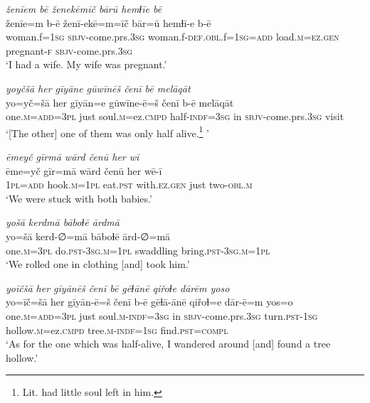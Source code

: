 \ea \label{ZQ.13}
\textit{ženīem bē ženekēmīč bārū hemɫīe bē} \\ 
\gll ženīe=m b-ē ženī-ekē=m=īč bār=ū hemɫī-e b-ē \\ 
 woman.f\textsc{=\textsc{1sg}} \textsc{sbjv-}come.prs\textsc{.3sg} woman.f\textsc{-def}\textsc{.obl}.f\textsc{=\textsc{1sg}}\textsc{=add} load\textsc{.m}\textsc{=ez.gen} pregnant\textsc{-f} \textsc{sbjv-}come.prs\textsc{.3sg} \\ 
\glt `I had a wife. My wife was pregnant.'
\z 
 
\ea \label{ZQ.19}
\textit{yoyčšā her gīyāne gūwīnēš čenī bē melāqāt} \\ 
\gll yo=yč=šā her gīyān=e gūwīne-ē=š čenī b-ē melāqāt \\ 
 one\textsc{.m}\textsc{=add}\textsc{=3pl} just soul\textsc{.m}=ez\textsc{.cmpd} half\textsc{-indf}\textsc{=3sg} in \textsc{sbjv-}come.prs\textsc{.3sg} visit \\ 
\glt `[The other] one of them was only half alive.\footnote{Lit. had little soul left in him.}    '
\z 
 
\ea \label{ZQ.21}
\textit{ēmeyč gīrmā wārd čenū her wī} \\ 
\gll ēme=yč gīr=mā wārd čenū her wē-ī \\ 
 \textsc{1pl}\textsc{=add} hook\textsc{.m}\textsc{=\textsc{1pl}} eat\textsc{.pst} with\textsc{.ez.gen} just two\textsc{-obl}\textsc{.m} \\ 
\glt `We were stuck with both babies.'
\z 
 
\ea \label{ZQ.22}
\textit{yošā kerdmā bāboɫē ārdmā} \\ 
\gll yo=šā kerd-∅=mā bāboɫē ārd-∅=mā \\ 
 one\textsc{.m}\textsc{=3pl} do\textsc{.pst}\textsc{-3sg}\textsc{.m}\textsc{=\textsc{1pl}} swaddling bring\textsc{.pst}\textsc{-3sg}\textsc{.m}\textsc{=\textsc{1pl}} \\ 
\glt `We rolled one in clothing [and] took him.'
\z 
 
\ea \label{ZQ.23}
\textit{yoīčšā her gīyānēš čenī bē gēɫānē qiřoɫe dārēm yoso} \\ 
\gll yo=īč=šā her gīyān-ē=š čenī b-ē gēɫā-ānē qiřoɫ=e dār-ē=m yos=o \\ 
 one\textsc{.m}\textsc{=add}\textsc{=3pl} just soul\textsc{.m}\textsc{-indf}\textsc{=3sg} in \textsc{sbjv-}come.prs\textsc{.3sg} turn\textsc{.pst}\textsc{-\textsc{1sg}} hollow\textsc{.m}=ez\textsc{.cmpd} tree\textsc{.m}\textsc{-indf}\textsc{=\textsc{1sg}} find\textsc{.pst}\textsc{=compl} \\ 
\glt `As for the one which was half-alive, I wandered around [and] found a tree hollow.'
\z 
 
